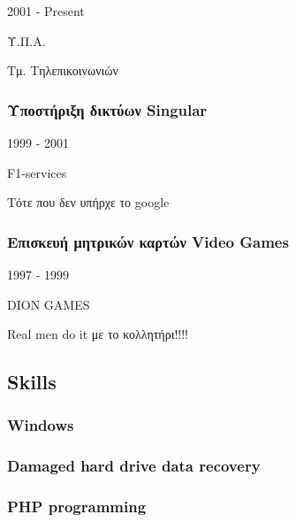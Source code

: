 \documentclass[english,]{article}
\begin{document}
2001 - Present

Υ.Π.Α.

Τμ. Τηλεπικοινωνιών

\hypertarget{ux3c5ux3c0ux3bfux3c3ux3c4ux3aeux3c1ux3b9ux3beux3b7-ux3b4ux3b9ux3baux3c4ux3cdux3c9ux3bd-singular}{%
\subsubsection{Υποστήριξη δικτύων
Singular}\label{ux3c5ux3c0ux3bfux3c3ux3c4ux3aeux3c1ux3b9ux3beux3b7-ux3b4ux3b9ux3baux3c4ux3cdux3c9ux3bd-singular}}

1999 - 2001

F1-services

Τότε που δεν υπήρχε το google

\hypertarget{ux3b5ux3c0ux3b9ux3c3ux3baux3b5ux3c5ux3ae-ux3bcux3b7ux3c4ux3c1ux3b9ux3baux3ceux3bd-ux3baux3b1ux3c1ux3c4ux3ceux3bd-video-games}{%
\subsubsection{Επισκευή μητρικών καρτών Video
Games}\label{ux3b5ux3c0ux3b9ux3c3ux3baux3b5ux3c5ux3ae-ux3bcux3b7ux3c4ux3c1ux3b9ux3baux3ceux3bd-ux3baux3b1ux3c1ux3c4ux3ceux3bd-video-games}}

1997 - 1999

DION GAMES

Real men do it με το κολλητήρι!!!!

\hypertarget{skills}{%
\subsection{\texorpdfstring{{ \emph{} \emph{} }
Skills}{    Skills}}\label{skills}}

\hypertarget{windows}{%
\subsubsection{Windows}\label{windows}}

\hypertarget{damaged-hard-drive-data-recovery}{%
\subsubsection{Damaged hard drive data
recovery}\label{damaged-hard-drive-data-recovery}}

\hypertarget{php-programming}{%
\subsubsection{PHP programming}\label{php-programming}}
\end{document}
